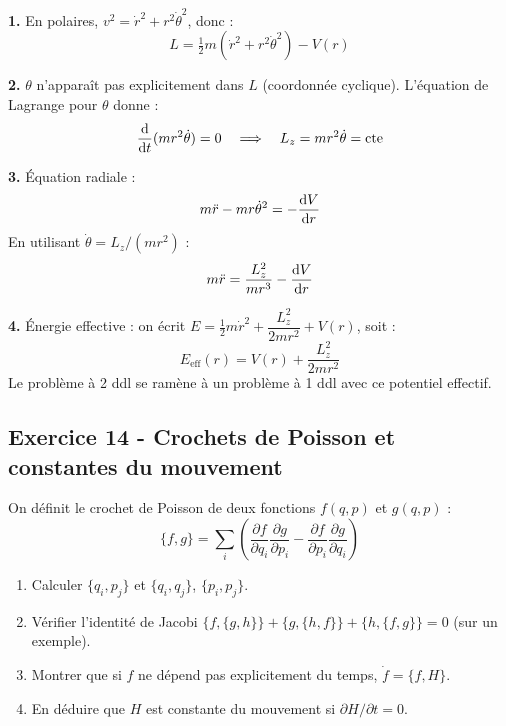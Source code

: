 \documentclass[12pt,a4paper]{article}
\begin{document}
\begin{boitecorrige}
\textbf{1.} En polaires, $v^2 = \dot r^2 + r^2\dot\theta^2$, donc :
\[
L = \tfrac{1}{2}m(\dot r^2 + r^2\dot\theta^2) - V(r)
\]

\textbf{2.} $\theta$ n'apparaît pas explicitement dans $L$ (coordonnée cyclique). L'équation de Lagrange pour $\theta$ donne :
\[
\frac{\mathrm{d}}{\mathrm{d} t}(mr^2\dot\theta) = 0 \quad\Longrightarrow\quad L_z = mr^2\dot\theta = \text{cte}
\]

\textbf{3.} Équation radiale :
\[
m\ddot r - mr\dot\theta^2 = -\frac{\mathrm{d} V}{\mathrm{d} r}
\]
En utilisant $\dot\theta = L_z/(mr^2)$ :
\[
m\ddot r = \frac{L_z^2}{mr^3} - \frac{\mathrm{d} V}{\mathrm{d} r}
\]

\textbf{4.} Énergie effective : on écrit $E = \tfrac{1}{2}m\dot r^2 + \dfrac{L_z^2}{2mr^2} + V(r)$, soit :
\[
E_\text{eff}(r) = V(r) + \frac{L_z^2}{2mr^2}
\]
Le problème à 2 ddl se ramène à un problème à 1 ddl avec ce potentiel effectif.
\end{boitecorrige}

\subsection*{Exercice 14 - Crochets de Poisson et constantes du mouvement \niveau{\difficile}}

\begin{boiteexercice}
On définit le crochet de Poisson de deux fonctions $f(q,p)$ et $g(q,p)$ :
\[
\{f, g\} = \sum_i \left(\frac{\partial f}{\partial q_i}\frac{\partial g}{\partial p_i} - \frac{\partial f}{\partial p_i}\frac{\partial g}{\partial q_i}\right)
\]
\begin{enumerate}
  \item Calculer $\{q_i, p_j\}$ et $\{q_i, q_j\}$, $\{p_i, p_j\}$.
  \item Vérifier l'identité de Jacobi $\{f, \{g, h\}\} + \{g, \{h, f\}\} + \{h, \{f, g\}\} = 0$ (sur un exemple).
  \item Montrer que si $f$ ne dépend pas explicitement du temps, $\dot f = \{f, H\}$.
  \item En déduire que $H$ est constante du mouvement si $\partial H/\partial t = 0$.
\end{enumerate}
\end{boiteexercice}
\end{document}
